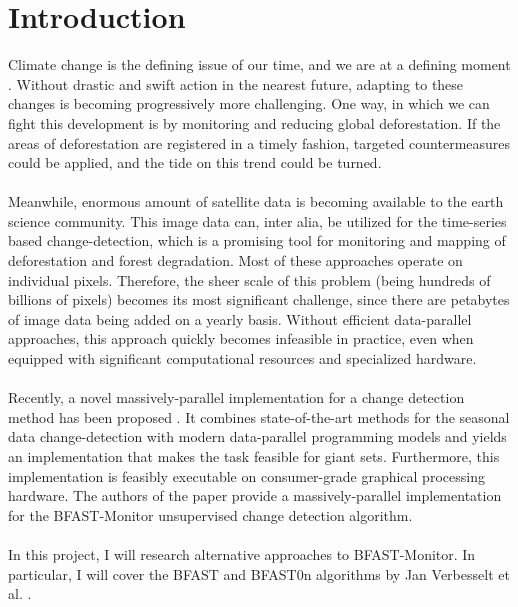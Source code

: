 \documentclass[main.tex]{subfiles}
\begin{document}
\chapter{Introduction}
\label{chap:intro}
Climate change is the defining issue of our time, and we are at a defining
moment \cite{un}. Without drastic and swift action in the nearest future, adapting to
these changes is becoming progressively more challenging. One way, in which we
can fight this development is by monitoring and reducing global deforestation.
If the areas of deforestation are registered in a timely fashion, targeted
countermeasures could be applied, and the tide on this trend could be turned. \\\\
Meanwhile, enormous amount of satellite data is becoming available to the earth
science community. This image data can, inter alia, be utilized for the
time-series based change-detection, which is a promising tool for monitoring and
mapping of deforestation and forest degradation. Most of these approaches
operate on individual pixels. Therefore, the sheer scale of this problem (being
hundreds of billions of pixels) becomes its most significant challenge, since
there are petabytes of image data being added on a yearly basis. Without
efficient data-parallel approaches, this approach quickly becomes infeasible in
practice, even when equipped with significant computational resources and
specialized hardware. \\\\
Recently, a novel massively-parallel implementation for a
change detection method has been proposed \cite{bfast_monitor}. It combines state-of-the-art methods
for the seasonal data change-detection with modern data-parallel programming
models and yields an implementation that makes the task feasible for giant sets.
Furthermore, this implementation is feasibly executable on consumer-grade
graphical processing hardware. The authors of the paper provide a
massively-parallel implementation for the BFAST-Monitor unsupervised change
detection algorithm. \\\\
In this project, I will research alternative approaches to
BFAST-Monitor. In particular, I will cover the BFAST and BFAST0n algorithms by
Jan Verbesselt et al. \cite{bfast}.



\end{document}
